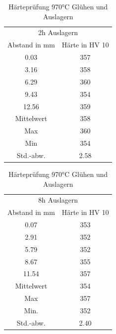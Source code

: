 \documentclass[a4paper, 11pt]{tubsreprt}
\begin{document}
\begin{table}[t] %
\begin{tabular}{c | c}
\multicolumn{2}{c}{2h Auslagern} \\
\cline{1-2}
Abstand in mm & Härte in HV 10 \\
0.03 & 357 \\
3.16 & 358 \\
6.29 & 360 \\
9.43 & 354 \\
12.56 & 359 \\
Mittelwert & 358 \\
Max & 360 \\
Min & 354 \\
Std.-abw. & 2.58 \\
\end{tabular}
\begin{tabular}{c | c}
\multicolumn{2}{c}{8h Auslagern} \\
\cline{1-2}
Abstand in mm & Härte in HV 10 \\
0.07	&		353 \\
2.91	&		352 \\
5.79	&		352\\
8.67	& 		355\\
11.54	& 		357\\
Mittelwert &	354\\
Max	& 			357\\
Min. &			352	\\	
Std.-abw.	&	2.40\\

\end{tabular}
\caption{Härteprüfung 970°C Glühen und Auslagern}
\label{heartepruefung9702h}
\end{table}
\end{document}

